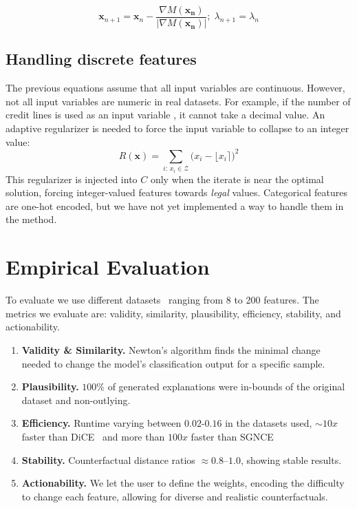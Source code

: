 \documentclass[12pt]{extarticle}
\numberwithin{equation}{section}
\begin{document}
\[
    \mathbf{x}_{n+1} = \mathbf{x}_n - \frac{\nabla M(\mathbf{x_n})}{|\nabla M(\mathbf{x_n})|};\;
    \lambda_{n+1} = \lambda_n
\]

\subsection*{Handling discrete features}
The previous equations assume that all input variables are continuous. However, not all input variables are numeric in real datasets. For example, if the number of credit lines is used as an input variable %
, it cannot take a decimal value. An adaptive regularizer is needed to force the input variable to collapse to an integer value:
\[
R(\mathbf{x})=\sum_{i:\, x_i\in \mathcal{Z}}\bigl(x_i-\lfloor x_i\rceil\bigr)^2
\]
This regularizer is injected into $C$ only when the iterate is near the optimal solution, forcing integer-valued features towards \emph{legal} values. Categorical features are one-hot encoded, but we have not yet implemented a way to handle them in the method.

\section*{Empirical Evaluation}
To evaluate we use different datasets~\cite{kaggleLoan1,spambase,santander} ranging from 8 to 200 features. The metrics we evaluate are: validity, similarity, plausibility, efficiency, stability, and actionability.
\begin{enumerate}
    \item \textbf{Validity \& Similarity.} Newton's algorithm finds the minimal change needed to change the model's classification output for a specific sample. 
    \item \textbf{Plausibility.} $100\%$ of generated explanations were in-bounds of the original dataset and non-outlying.  
    \item \textbf{Efficiency.} Runtime varying between $0.02$-$0.16$ in the datasets used, $\sim10x$ faster than DiCE~\cite{dice} and more than $100x$ faster than SGNCE~\cite{sgnce}
    \item \textbf{Stability.} Counterfactual distance ratios $\approx0.8$–$1.0$, showing stable results.
    \item \textbf{Actionability.} We let the user to define the weights, encoding the difficulty to change each feature, allowing for diverse and realistic counterfactuals.
\end{enumerate}
\end{document}
